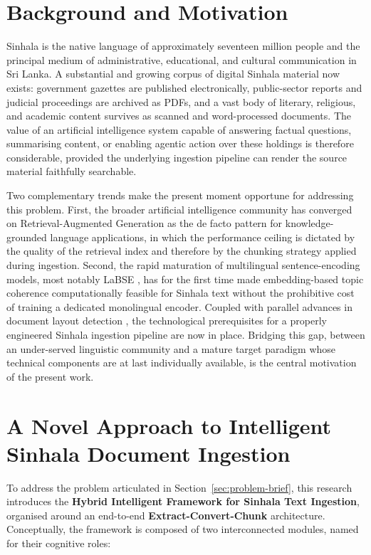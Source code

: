 \documentclass[12pt,a4paper,oneside]{report}
\begin{document}
\section{Background and Motivation}
\label{sec:background-motivation}
Sinhala is the native language of approximately seventeen million people and the principal medium of administrative, educational, and cultural communication in Sri Lanka. A substantial and growing corpus of digital Sinhala material now exists: government gazettes are published electronically, public-sector reports and judicial proceedings are archived as PDFs, and a vast body of literary, religious, and academic content survives as scanned and word-processed documents. The value of an artificial intelligence system capable of answering factual questions, summarising content, or enabling agentic action over these holdings is therefore considerable, provided the underlying ingestion pipeline can render the source material faithfully searchable.

Two complementary trends make the present moment opportune for addressing this problem. First, the broader artificial intelligence community has converged on Retrieval-Augmented Generation \cite{lewis2020rag} as the de facto pattern for knowledge-grounded language applications, in which the performance ceiling is dictated by the quality of the retrieval index and therefore by the chunking strategy applied during ingestion. Second, the rapid maturation of multilingual sentence-encoding models, most notably LaBSE \cite{feng2022labse, reimers2019sbert}, has for the first time made embedding-based topic coherence computationally feasible for Sinhala text without the prohibitive cost of training a dedicated monolingual encoder. Coupled with parallel advances in document layout detection \cite{ronneberger2015unet, wickramasinghe2024unet}, the technological prerequisites for a properly engineered Sinhala ingestion pipeline are now in place. Bridging this gap, between an under-served linguistic community and a mature target paradigm whose technical components are at last individually available, is the central motivation of the present work.

\section{A Novel Approach to Intelligent Sinhala Document Ingestion}
\label{sec:novel-approach}
To address the problem articulated in Section~\ref{sec:problem-brief}, this research introduces the \textbf{Hybrid Intelligent Framework for Sinhala Text Ingestion}, organised around an end-to-end \textbf{Extract-Convert-Chunk} architecture. Conceptually, the framework is composed of two interconnected modules, named for their cognitive roles:
\end{document}

